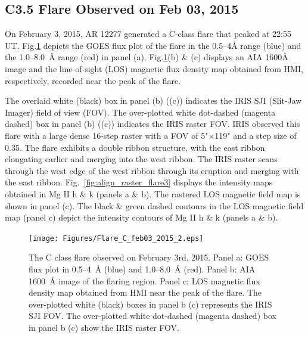 \subsection{C3.5 Flare Observed on Feb 03, 2015}

On February 3, 2015, AR 12277 generated a C-class flare that peaked at 22:55 UT. Fig.\ref{flare3} depicts the GOES flux plot of the flare in the 0.5{--}4{\AA} range (blue) and the 1.0{--}8.0~{\AA} range (red) in panel (a). Fig.\ref{flare3}(b) \& (c) displays an AIA 1600{\AA} image and the line-of-sight (LOS) magnetic flux density map obtained from HMI, respectively, recorded near the peak of the flare.

The overlaid white (black) box in panel (b) ((c)) indicates the IRIS SJI (Slit-Jaw Imager) field of view (FOV). The over-plotted white dot-dashed (magenta dashed) box in panel (b) ((c)) indicates the IRIS raster FOV. IRIS observed this flare with a large dense 16-step raster with a FOV of 5"$\times$119" and a step size of 0.35\arcsec. The flare exhibits a double ribbon structure, with the east ribbon elongating earlier and merging into the west ribbon. The IRIS raster scans through the west edge of the west ribbon through its eruption and merging with the east ribbon. Fig.~\ref{fig:align_raster_flare3} displays the intensity maps obtained in Mg II h \& k (panels a \& b). The rastered LOS magnetic field map is shown in panel (c). The black \& green dashed contours in the LOS magnetic field map (panel c) depict the intensity contours of Mg II h \& k (panels a \& b).

\begin{figure}[ht!]
    \centering
\hspace*{-.6in}
\texttt{[image: Figures/Flare\_C\_feb03\_2015\_2.eps]}
\caption{The C class flare observed on February 3rd, 2015. Panel a: GOES flux plot in 0.5{--}4~{\AA} (blue) and 1.0{--}8.0~{\AA} (red). Panel b: AIA 1600~{\AA} image of the flaring region. Panel c: LOS magnetic flux density map obtained from HMI near the peak of the flare. The over-plotted white (black) boxes in panel b (c) represents the IRIS SJI FOV. The over-plotted white dot-dashed (magenta dashed) box in panel b (c) show the IRIS raster FOV.}\label{flare3}
\end{figure}

